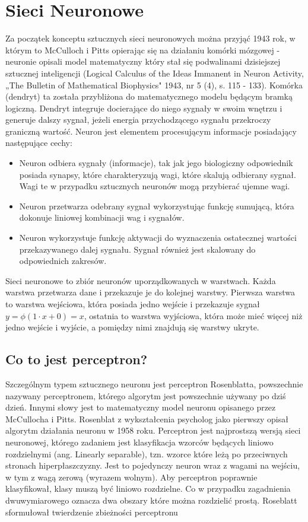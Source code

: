 \newpage
\section{Sieci Neuronowe}
Za początek konceptu sztucznych sieci neuronowych można przyjąć 1943 rok, w którym to McCulloch i Pitts opierając się na działaniu komórki mózgowej - neuronie opisali model matematyczny który stał się podwalinami dzisiejszej sztucznej inteligencji (Logical Calculus of the Ideas Immanent in Neuron Activity, „The Bulletin of Mathematical Biophysics" 1943, nr 5 (4), s. 115 - 133). Komórka (dendryt) ta została przybliżona do matematycznego modelu będącym bramką logiczną. Dendryt integruje docierające do niego sygnały w swoim wnętrzu i generuje dalszy sygnał, jeżeli energia przychodzącego sygnału przekroczy graniczną wartość. \cite{raschka_python}
Neuron jest elementem procesującym informacje posiadający następujące cechy:\cite{haykin2009neural}

\begin{itemize}
    \item Neuron odbiera sygnały (informacje), tak jak jego biologiczny odpowiednik posiada synapsy, które charakteryzują wagi, które skalują odbierany sygnał. Wagi te w przypadku sztucznych neuronów mogą przybierać ujemne wagi.
    \item Neuron przetwarza odebrany sygnał wykorzystując funkcję sumującą, która dokonuje liniowej kombinacji wag i sygnałów.
    \item Neuron wykorzystuje funkcję aktywacji do wyznaczenia ostatecznej wartości przekazywanego dalej sygnału. Sygnał również jest skalowany do odpowiednich zakresów.
\end{itemize} 
    

Sieci neuronowe to zbiór neuronów uporządkowanych w warstwach. Każda warstwa przetwarza dane i przekazuje je do kolejnej warstwy. Pierwsza warstwa to warstwa wejściowa, która posiada jedno wejście i przekazuje sygnał $y = \phi(1\cdot x+0) = x$, ostatnia to warstwa wyjściowa, która może mieć więcej niż jedno wejście i wyjście, a pomiędzy nimi znajdują się warstwy ukryte. \cite{tutorial_nn_activation}

\subsection{Co to jest perceptron?}
Szczególnym typem sztucznego neuronu jest perceptron Rosenblatta, powszechnie nazywany perceptronem, którego algorytm jest powszechnie używany po dziś dzień. Innymi słowy jest to matematyczny model neuronu opisanego przez McCullocha i Pitts. Rosenblat z wykształcenia psycholog jako pierwszy opisał algorytm działania neuronu w 1958 roku. Perceptron jest najprostszą wersją sieci neuronowej, którego zadaniem jest klasyfikacja wzorców będących liniowo rozdzielnymi (ang. Linearly separable), tzn. wzorce które leżą po przeciwnych stronach hiperpłaszczyzny. 
Jest to pojedynczy neuron wraz z wagami na wejściu, w tym z wagą zerową (wyrazem wolnym). 
Aby perceptron poprawnie klasyfikował, klasy muszą być liniowo rozdzielne. Co w przypadku zagadnienia dwuwymiarowego oznacza dwa obszary które można rozdzielić prostą.
Roseblatt sformułował twierdzenie zbieżności perceptronu

